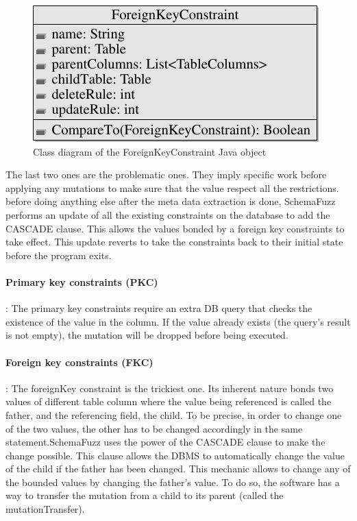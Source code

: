 \documentclass{article}
\begin{document}
\begin{empfile}
\begin{figure} [h!]
\centering
\includegraphics[width=\textwidth]{ForeignKeyClassDiagram-1.pdf}
\caption{Class diagram of the ForeignKeyConstraint Java object}
\end{figure}

\bigskip

The last two ones are the problematic ones. They imply specific work before applying any mutations to make sure that the value respect all the restrictions. before doing anything else after the meta data extraction is done, SchemaFuzz performs an update of all the existing constraints on the database to add the CASCADE clause. This allows the values bonded by a foreign key constraints to take effect. This update reverts to take the constraints back to their initial state before the program exits.
				\paragraph{Primary key constraints (PKC)} :
The primary key constraints require an extra DB query that checks the existence of the value in the column. If the value already exists (the query's result is not empty), the mutation will be dropped before being executed.
				\paragraph{Foreign key constraints (FKC)} :
The foreignKey constraint is the trickiest one. Its inherent nature bonds two values of different table column where the value being referenced is called the father, and the referencing field, the child. To be precise, in order to change one of the two values, the other has to be changed accordingly in the same statement.SchemaFuzz uses the power of the CASCADE clause to make the change possible. This clause allows the DBMS to automatically change the value of the child if the father has been changed.
This mechanic allows to change any of the bounded values by changing the father's value.
To do so, the software has a way to transfer the mutation from a child to its parent (called the mutationTransfer).


\end{empfile}
\end{document}
